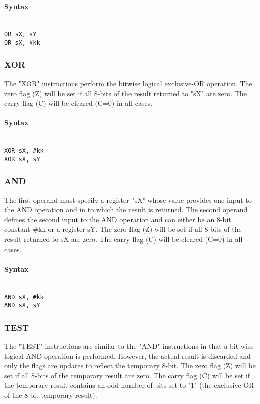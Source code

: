             \paragraph{Syntax}
                ~\\
                \verb'OR sX, sY'\\
                \verb'OR sX, #kk'

        \subsubsection{XOR}
            The "XOR" instructions perform the bit\-wise logical exclusive-OR operation. The zero flag (Z) will be set if all 8-bits of the result returned to "sX" are zero. The carry flag (C) will be cleared (C=0) in all cases.

            \paragraph{Syntax}
                ~\\
                \verb'XOR sX, #kk'\\
                \verb'XOR sX, sY'

        \subsubsection{AND}
            The first operand must specify a register "sX" whose value provides one input to the AND operation and in to which the result is returned. The second operand defines the second input to the AND operation and can either be an 8-bit constant \#kk or a register sY. The zero flag (Z) will be set if all 8-bits of the result returned to sX are zero. The carry flag (C) will be cleared (C=0) in all cases.

            \paragraph{Syntax}
                ~\\
                \verb'AND sX, #kk'\\
                \verb'AND sX, sY'

        \subsubsection{TEST}
            The "TEST" instructions are similar to the "AND" instructions in that a bit-wise logical AND operation is performed. However, the actual result is discarded and only the flags are updates to reflect the temporary 8-bit. The zero flag (Z) will be set if all 8-bits of the temporary result are zero. The carry flag (C) will be set if the temporary result contains an odd number of bits set to "1" (the exclusive-OR of the 8-bit temporary result).

